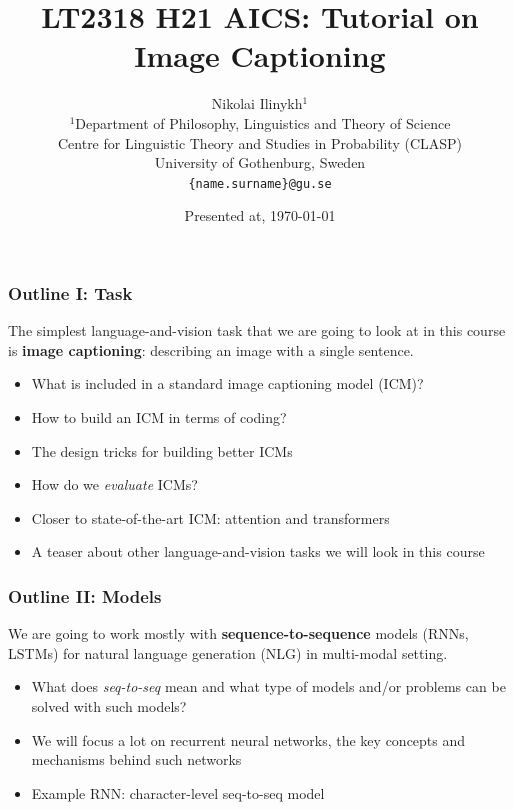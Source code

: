\documentclass[aspectratio=1610]{beamer} %
\title{\color{blue} LT2318 H21 AICS: Tutorial on Image Captioning}
\author{Nikolai Ilinykh$^{1}$ \\
        $^{1}$Department of Philosophy, Linguistics and Theory of Science \\ 
        Centre for Linguistic Theory and Studies in Probability (CLASP) \\
        University of Gothenburg, Sweden \\
      \texttt{\{name.surname\}@gu.se}}
\date{Presented at, \today}
\begin{document}
\frame[plain]{\titlepage}









\begin{frame}

\frametitle{Outline I: Task}

The simplest language-and-vision task that we are going to look at in this course is \textbf{image captioning}: describing an image with a single sentence.

\begin{itemize}
\pause
\item What is included in a standard image captioning model (ICM)?
\pause
\item How to build an ICM in terms of coding?
\pause
\item The design tricks for building better ICMs
\pause
\item How do we \textit{evaluate} ICMs?
\pause
\item Closer to state-of-the-art ICM: attention and transformers
\pause
\item A teaser about other language-and-vision tasks we will look in this course

\end{itemize}

\end{frame}


\begin{frame}

\frametitle{Outline II: Models}

We are going to work mostly with \textbf{sequence-to-sequence} models (RNNs, LSTMs) for natural language generation (NLG) in multi-modal setting.

\begin{itemize}
\pause
\item What does \textit{seq-to-seq} mean and what type of models and/or problems can be solved with such models?
\pause
\item We will focus a lot on recurrent neural networks, the key concepts and mechanisms behind such networks
\pause
\item Example RNN: character-level seq-to-seq model

\end{itemize}

\end{frame}
\end{document}
